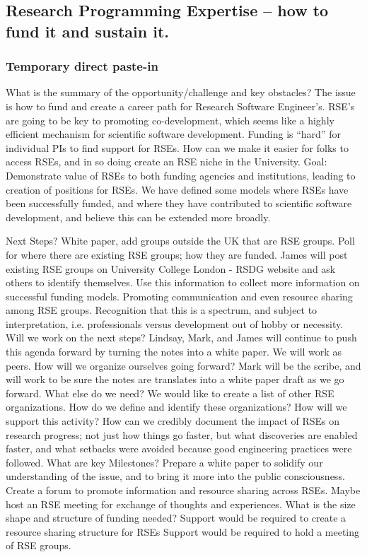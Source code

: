 \subsection{Research Programming Expertise -- how to fund it and sustain it.}

\subsubsection{Temporary direct paste-in}

What is the summary of the opportunity/challenge and key obstacles?
The issue is how to fund and create a career path for Research Software Engineer’s. RSE’s are going to be key to promoting co-development, which seems like a highly efficient mechanism for scientific software development.
Funding is “hard” for individual PIs to find support for RSEs. How can we make it easier for folks to access RSEs, and in so doing create an RSE niche in the University.
Goal: Demonstrate value of RSEs to both funding agencies and institutions, leading to creation of positions for RSEs.
 We have defined some models where RSEs have been successfully funded, and where they have contributed to scientific software development, and believe this can be extended more broadly.

Next Steps?
White paper, add groups outside the UK that are RSE groups.
Poll for where there are existing RSE groups; how they are funded. James will post existing RSE groups on University College London - RSDG website and ask others to identify themselves. Use this information to collect more information on successful funding models.
Promoting communication and even resource sharing among RSE groups.
Recognition that this is a spectrum, and subject to interpretation, i.e. professionals versus development out of hobby or necessity.
Will we work on the next steps?
Lindsay, Mark, and James will continue to push this agenda forward by turning the notes into a white paper. We will work as peers. 
How will we organize ourselves going forward?
Mark will be the scribe, and will work to be sure the notes are translates into a white paper draft as we go forward.
What else do we need?
We would like to create a list of other RSE organizations. How do we define and identify these organizations? How will we support this activity?
How can we credibly document the impact of RSEs on research progress; not just how things go faster, but what discoveries are enabled faster, and what setbacks were avoided because good engineering practices were followed.
What are key Milestones?
Prepare a white paper to solidify our understanding of the issue, and to bring it more into the public consciousness.
Create a forum to promote information and resource sharing across RSEs.
Maybe host an RSE meeting for exchange of thoughts and experiences.
What is the size shape and structure of funding needed?
Support would be required to create a resource sharing structure for RSEs
Support would be required to hold a meeting of RSE groups.



